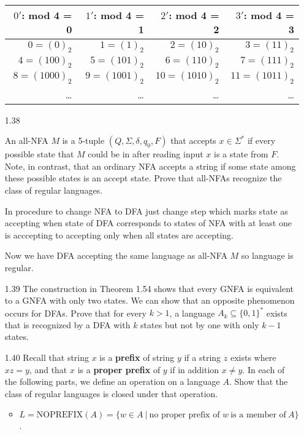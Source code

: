 \begin{enumerate}
          \begin{table}[H]
              \centering
              \begin{tabular}{|r|r|r|r|}
                  \hline
                  $0'$: mod 4 = 0 & $1'$: mod  4 = 1 & $2'$: mod 4 = 2 & $3'$: mod 4 = 3 \\
                  \hline
                  $0 = (0)_2$     & $1 = (1)_2$      & $2 = (10)_2$    & $3 = (11)_2$    \\
                  $4 = (100)_2$   & $5 = (101)_2$    & $6 = (110)_2$   & $7 = (111)_2$   \\
                  $8 = (1000)_2$  & $9 = (1001)_2$   & $10 = (1010)_2$ & $11 = (1011)_2$ \\
                  \ldots          & \ldots           & \ldots          & \ldots          \\
                  \hline
              \end{tabular}
          \end{table}

    \item [1.38]

          An all-NFA $M$ is a 5-tuple $(Q,\Sigma,\delta,q_0,F)$ that accepts $x \in \Sigma^\ast$ if every possible state that $M$ could be in after reading input $x$ is a state from $F$. Note, in contrast, that an ordinary NFA accepts a string if some state among these possible states is an accept state. Prove that all-NFAs recognize the class of regular languages.

          In procedure to change NFA to DFA just change step which marks state as accepting when state of DFA corresponds to states of NFA with at least one is acccepting to accepting only when all states are accepting.

          Now we have DFA accepting the same language as all-NFA $M$ so language is regular.
    \item [1.39]
          The construction in Theorem 1.54 shows that every GNFA is equivalent to a GNFA with only two states. We can show that an opposite phenomenon occurs for DFAs. Prove that for every $k > 1$, a language $A_k \subseteq \{0,1\}^\ast$ exists that is recognized by a DFA with $k$ states but not by one with only $k-1$ states.
    \item [1.40]
          Recall that string $x$ is a \textbf{prefix} of string $y$ if a string $z$ exists where $xz = y$, and that $x$ is a \textbf{proper prefix} of $y$ if in addition $x \neq y$. In each of the following parts, we define an operation on a language $A$. Show that the class of regular languages is closed under that operation.
          \begin{itemize}
              \item $L = \text{NOPREFIX}(A)=\{w \in A~|~\text{no proper prefix of } w~ \text{is a member of}~ A\}$.


\end{itemize}
\end{enumerate}
